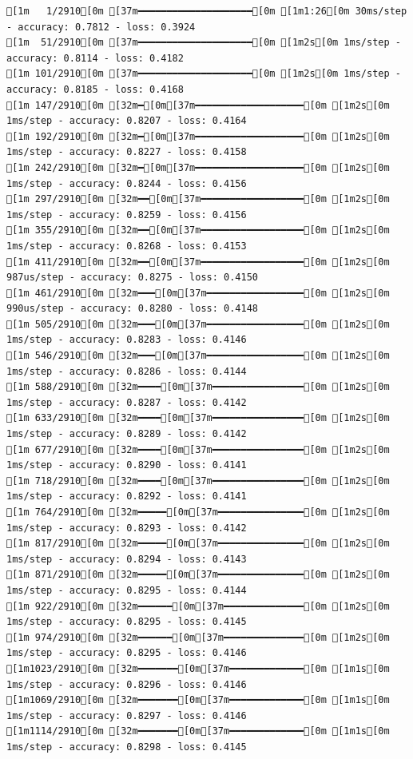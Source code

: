 \documentclass[
  letterpaper,
  DIV=11,
  numbers=noendperiod]{scrartcl}
\begin{document}
\begin{verbatim}
[1m   1/2910[0m [37m━━━━━━━━━━━━━━━━━━━━[0m [1m1:26[0m 30ms/step - accuracy: 0.7812 - loss: 0.3924
[1m  51/2910[0m [37m━━━━━━━━━━━━━━━━━━━━[0m [1m2s[0m 1ms/step - accuracy: 0.8114 - loss: 0.4182   
[1m 101/2910[0m [37m━━━━━━━━━━━━━━━━━━━━[0m [1m2s[0m 1ms/step - accuracy: 0.8185 - loss: 0.4168
[1m 147/2910[0m [32m━[0m[37m━━━━━━━━━━━━━━━━━━━[0m [1m2s[0m 1ms/step - accuracy: 0.8207 - loss: 0.4164
[1m 192/2910[0m [32m━[0m[37m━━━━━━━━━━━━━━━━━━━[0m [1m2s[0m 1ms/step - accuracy: 0.8227 - loss: 0.4158
[1m 242/2910[0m [32m━[0m[37m━━━━━━━━━━━━━━━━━━━[0m [1m2s[0m 1ms/step - accuracy: 0.8244 - loss: 0.4156
[1m 297/2910[0m [32m━━[0m[37m━━━━━━━━━━━━━━━━━━[0m [1m2s[0m 1ms/step - accuracy: 0.8259 - loss: 0.4156
[1m 355/2910[0m [32m━━[0m[37m━━━━━━━━━━━━━━━━━━[0m [1m2s[0m 1ms/step - accuracy: 0.8268 - loss: 0.4153
[1m 411/2910[0m [32m━━[0m[37m━━━━━━━━━━━━━━━━━━[0m [1m2s[0m 987us/step - accuracy: 0.8275 - loss: 0.4150
[1m 461/2910[0m [32m━━━[0m[37m━━━━━━━━━━━━━━━━━[0m [1m2s[0m 990us/step - accuracy: 0.8280 - loss: 0.4148
[1m 505/2910[0m [32m━━━[0m[37m━━━━━━━━━━━━━━━━━[0m [1m2s[0m 1ms/step - accuracy: 0.8283 - loss: 0.4146  
[1m 546/2910[0m [32m━━━[0m[37m━━━━━━━━━━━━━━━━━[0m [1m2s[0m 1ms/step - accuracy: 0.8286 - loss: 0.4144
[1m 588/2910[0m [32m━━━━[0m[37m━━━━━━━━━━━━━━━━[0m [1m2s[0m 1ms/step - accuracy: 0.8287 - loss: 0.4142
[1m 633/2910[0m [32m━━━━[0m[37m━━━━━━━━━━━━━━━━[0m [1m2s[0m 1ms/step - accuracy: 0.8289 - loss: 0.4142
[1m 677/2910[0m [32m━━━━[0m[37m━━━━━━━━━━━━━━━━[0m [1m2s[0m 1ms/step - accuracy: 0.8290 - loss: 0.4141
[1m 718/2910[0m [32m━━━━[0m[37m━━━━━━━━━━━━━━━━[0m [1m2s[0m 1ms/step - accuracy: 0.8292 - loss: 0.4141
[1m 764/2910[0m [32m━━━━━[0m[37m━━━━━━━━━━━━━━━[0m [1m2s[0m 1ms/step - accuracy: 0.8293 - loss: 0.4142
[1m 817/2910[0m [32m━━━━━[0m[37m━━━━━━━━━━━━━━━[0m [1m2s[0m 1ms/step - accuracy: 0.8294 - loss: 0.4143
[1m 871/2910[0m [32m━━━━━[0m[37m━━━━━━━━━━━━━━━[0m [1m2s[0m 1ms/step - accuracy: 0.8295 - loss: 0.4144
[1m 922/2910[0m [32m━━━━━━[0m[37m━━━━━━━━━━━━━━[0m [1m2s[0m 1ms/step - accuracy: 0.8295 - loss: 0.4145
[1m 974/2910[0m [32m━━━━━━[0m[37m━━━━━━━━━━━━━━[0m [1m2s[0m 1ms/step - accuracy: 0.8295 - loss: 0.4146
[1m1023/2910[0m [32m━━━━━━━[0m[37m━━━━━━━━━━━━━[0m [1m1s[0m 1ms/step - accuracy: 0.8296 - loss: 0.4146
[1m1069/2910[0m [32m━━━━━━━[0m[37m━━━━━━━━━━━━━[0m [1m1s[0m 1ms/step - accuracy: 0.8297 - loss: 0.4146
[1m1114/2910[0m [32m━━━━━━━[0m[37m━━━━━━━━━━━━━[0m [1m1s[0m 1ms/step - accuracy: 0.8298 - loss: 0.4145

\end{verbatim}
\end{document}
